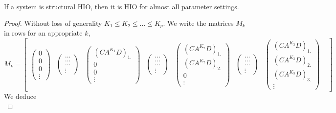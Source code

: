\begin{theorem}{}{}
	If a system is structural HIO, then it is HIO for almost all parameter settings.
\end{theorem}
\begin{proof}
	Without loss of generality $K_1\leq K_2 \leq \ldots\leq K_p$. We write the 
	matrices $M_k$ in rows for an appropriate $k$,
	\begin{equation}
	M_k = \begin{bmatrix}
	\begin{pmatrix} 0 \\ 0 \\ 0 \\ \vdots \end{pmatrix} &
	\begin{pmatrix} \hdots \\ \hdots \\ \hdots \\ \vdots \end{pmatrix}&
	\begin{pmatrix} (CA^{K_1}D)_{1.} \\ 0 \\ 0 \\ \vdots \end{pmatrix} &
		\begin{pmatrix} \hdots \\ \hdots \\ \hdots \\ \vdots \end{pmatrix} & 
	\begin{pmatrix} (C A^{K_2} D)_{1.} \\ (CA^{K_2}D)_{2.} \\ 0 \\ \vdots \end{pmatrix} &
		\begin{pmatrix} \hdots \\ \hdots \\ \hdots \\ \vdots \end{pmatrix} &
	\begin{pmatrix} (CA^{K_3}D)_{1.} \\ (CA^{K_3}D)_{2.} \\ (CA^{K_3}D)_{3.} 
	\\ \vdots \end{pmatrix} &
	\end{bmatrix} \label{eq:M_q_in_rows}
	\end{equation}
	We deduce 
	\begin{equation}

\end{equation}
\end{proof}
